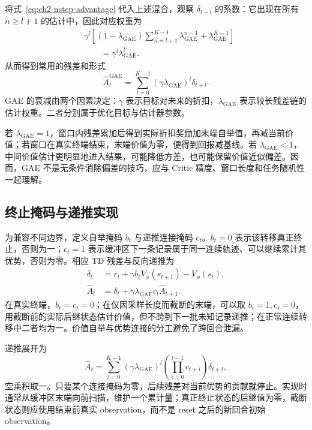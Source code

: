 将式~\eqref{eq:ch2-nstep-advantage} 代入上述混合，观察 $\delta_{t+l}$ 的系数：它出现在所有 $n\geq l+1$ 的估计中，因此对应权重为
\begin{align}
    &\gamma^l\left[(1-\lambda_{\mathrm{GAE}})
       \sum_{n=l+1}^{K-1}\lambda_{\mathrm{GAE}}^{n-1}
       +\lambda_{\mathrm{GAE}}^{K-1}\right]\\
    &\qquad=\gamma^l\lambda_{\mathrm{GAE}}^l.
    \label{eq:ch2-gae-coefficient}
\end{align}
从而得到常用的残差和形式
\begin{equation}
    \widehat A_t^{\mathrm{GAE}}
    =\sum_{l=0}^{K-1}(\gamma\lambda_{\mathrm{GAE}})^l\delta_{t+l}.
    \label{eq:ch2-gae-residual-sum}
\end{equation}
GAE 的衰减由两个因素决定：$\gamma$ 表示目标对未来的折扣，$\lambda_{\mathrm{GAE}}$ 表示较长残差链的估计权重。二者分别属于优化目标与估计器参数。

若 $\lambda_{\mathrm{GAE}}=1$，窗口内残差累加后得到实际折扣奖励加末端自举值，再减当前价值；若窗口在真实终端结束，末端价值为零，便得到回报减基线。若 $\lambda_{\mathrm{GAE}}<1$，中间价值估计更明显地进入结果，可能降低方差，也可能保留价值近似偏差。因而，GAE 不是无条件消除偏差的技巧，应与 Critic 精度、窗口长度和任务随机性一起理解。

\subsection{终止掩码与递推实现}
\label{sec:ch2-terminal-masks}

为兼容不同边界，定义自举掩码 $b_t$ 与递推连接掩码 $c_t$。$b_t=0$ 表示该转移真正终止，否则为一；$c_t=1$ 表示缓冲区下一条记录属于同一连续轨迹、可以继续累计其优势，否则为零。相应 TD 残差与反向递推为
\begin{align}
    \delta_t&=r_t+\gamma b_t V_\phi(s_{t+1})-V_\phi(s_t),
    \label{eq:ch2-masked-td}\\
    \widehat A_t&=\delta_t+\gamma\lambda_{\mathrm{GAE}}c_t\widehat A_{t+1}.
    \label{eq:ch2-masked-gae}
\end{align}
在真实终端，$b_t=c_t=0$；在仅因采样长度而截断的末端，可以取 $b_t=1,c_t=0$，用截断前的实际后继状态估计价值，但不跨到下一批未知记录递推；在正常连续转移中二者均为一。价值自举与优势连接的分工避免了跨回合泄漏。

递推展开为
\begin{equation}
    \widehat A_t=\sum_{l=0}^{K-1}(\gamma\lambda_{\mathrm{GAE}})^l
    \left(\prod_{i=0}^{l-1}c_{t+i}\right)\delta_{t+l},
    \label{eq:ch2-gae-products}
\end{equation}
空乘积取一。只要某个连接掩码为零，后续残差对当前优势的贡献就停止。实现时通常从缓冲区末端向前扫描，维护一个累计量；真正终止状态的后继值为零，截断状态则应使用结束前真实 observation，而不是 reset 之后的新回合初始 observation。

